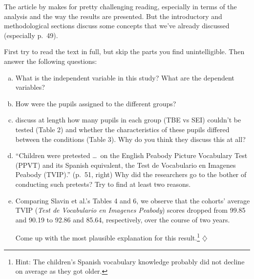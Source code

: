 \documentclass[a4paper]{tufte-book}\usepackage[]{graphicx}\usepackage[]{xcolor}
\newcommand*{\parend}[1][$\diamondsuit$]{%
\leavevmode\unskip\penalty9999 \hbox{}\nobreak\hfill
    \quad\hbox{#1}%
}
\begin{document}
The article by \citet{Slavin2011} makes for pretty challenging reading,
especially in terms of the analysis and the
way the results are presented. But the introductory and methodological sections
discuss some concepts that we've already discussed (especially p.~49).

First try to read the text in full, but skip the parts you find unintelligible.
Then answer the following questions:

\begin{enumerate}[(a)]

  \item What is the independent variable in this study?
        What are the dependent variables?

  \item How were the pupils assigned to the different groups?

  \item \citeauthor{Slavin2011} discuss at length how many pupils in each group
  (TBE vs SEI) couldn't be tested (Table 2) and whether the characteristics
  of these pupils differed between the conditions (Table 3). Why do you think
  they discuss this at all?

  \item ``Children were pretested \dots\ on the English Peabody
  Picture Vocabulary Test (PPVT) and its Spanish equivalent, the Test de
  Vocabulario en Imagenes Peabody (TVIP).'' (p.~51, right)
  Why did the researchers go to the bother of conducting such pretests?
  Try to find at least two reasons.

  \item  Comparing Slavin et al.'s Tables 4 and 6,
  we observe that the cohorts' average TVIP
  ({\it Test de Vocabulario en Imagenes Peabody}) scores dropped
  from 99.85 and 90.19 to 92.86 and 85.64, respectively,
  over the course of two years.

  Come up with the most
  plausible explanation for this result.\footnote{Hint: The children's Spanish vocabulary knowledge probably did not
  decline on average as they got older.}\parend
\end{enumerate}
\end{document}

